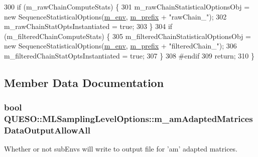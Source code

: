 \begin{DoxyCode}
300 \textcolor{preprocessor}{}  \textcolor{keywordflow}{if} (m\_rawChainComputeStats) \{
301     m\_rawChainStatisticalOptionsObj = \textcolor{keyword}{new} SequenceStatisticalOptions(\hyperlink{class_q_u_e_s_o_1_1_m_l_sampling_level_options_a5bdc1fb3f6eb46f73feec9c356c9a1b8}{m\_env},
      \hyperlink{class_q_u_e_s_o_1_1_m_l_sampling_level_options_a4423067de3fa689d820abeba4dc5babc}{m\_prefix} + \textcolor{stringliteral}{"rawChain\_"});
302     m\_rawChainStatOptsInstantiated  = \textcolor{keyword}{true};
303   \}
304   \textcolor{keywordflow}{if} (m\_filteredChainComputeStats) \{
305     m\_filteredChainStatisticalOptionsObj = \textcolor{keyword}{new} SequenceStatisticalOptions(\hyperlink{class_q_u_e_s_o_1_1_m_l_sampling_level_options_a5bdc1fb3f6eb46f73feec9c356c9a1b8}{m\_env},
      \hyperlink{class_q_u_e_s_o_1_1_m_l_sampling_level_options_a4423067de3fa689d820abeba4dc5babc}{m\_prefix} + \textcolor{stringliteral}{"filteredChain\_"});
306     m\_filteredChainStatOptsInstantiated  = \textcolor{keyword}{true};
307   \}
308 \textcolor{preprocessor}{#endif}
309 \textcolor{preprocessor}{}  \textcolor{keywordflow}{return};
310 \}
\end{DoxyCode}


\subsection{Member Data Documentation}
\hypertarget{class_q_u_e_s_o_1_1_m_l_sampling_level_options_ad1ac51fd4b35c5decca04048ebeca3f2}{
\subsubsection[{m\-\_\-am\-Adapted\-Matrices\-Data\-Output\-Allow\-All}]{\setlength{\rightskip}{0pt plus 5cm}bool Q\-U\-E\-S\-O\-::\-M\-L\-Sampling\-Level\-Options\-::m\-\_\-am\-Adapted\-Matrices\-Data\-Output\-Allow\-All}}\label{class_q_u_e_s_o_1_1_m_l_sampling_level_options_ad1ac51fd4b35c5decca04048ebeca3f2}


Whether or not sub\-Envs will write to output file for 'am' adapted matrices. 



